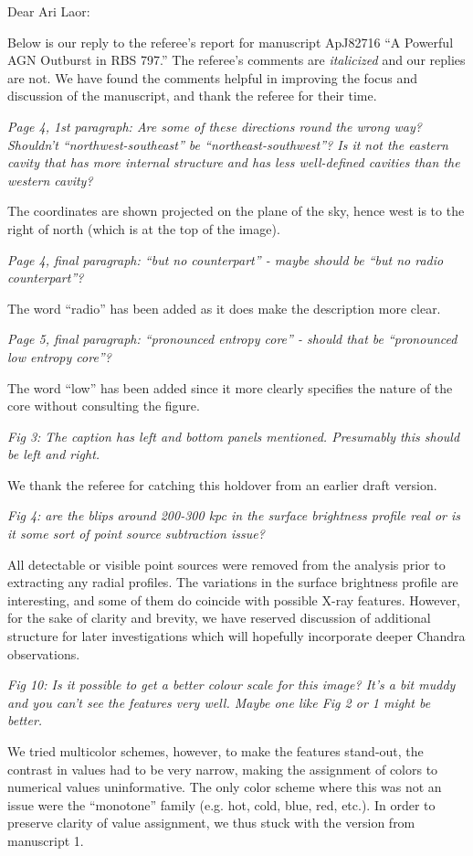 \documentclass[11pt]{article}
\begin{document}
Dear Ari Laor:

Below is our reply to the referee's report for manuscript ApJ82716 ``A
Powerful AGN Outburst in RBS 797.'' The referee's comments are
{\it{italicized}} and our replies are not. We have found the comments
helpful in improving the focus and discussion of the manuscript, and
thank the referee for their time.

\hrulefill

{\it{Page 4, 1st paragraph: Are some of these directions round the
    wrong way? Shouldn't ``northwest-southeast'' be
    ``northeast-southwest''? Is it not the eastern cavity that has
    more internal structure and has less well-defined cavities than
    the western cavity?}}

The coordinates are shown projected on the plane of the sky, hence
west is to the right of north (which is at the top of the image).

\hrulefill

{\it{Page 4, final paragraph: ``but no counterpart'' - maybe should be
    ``but no radio counterpart''?}}

The word ``radio'' has been added as it does make the description more
clear.

\hrulefill

{\it{Page 5, final paragraph: ``pronounced entropy core'' - should
    that be ``pronounced low entropy core''?}}

The word ``low'' has been added since it more clearly specifies the
nature of the core without consulting the figure.

\hrulefill

{\it{Fig 3: The caption has left and bottom panels
    mentioned. Presumably this should be left and right.}}

We thank the referee for catching this holdover from an earlier draft
version.

\hrulefill

{\it{Fig 4: are the blips around 200-300 kpc in the surface brightness
    profile real or is it some sort of point source subtraction
    issue?}}

All detectable or visible point sources were removed from the analysis
prior to extracting any radial profiles. The variations in the surface
brightness profile are interesting, and some of them do coincide with
possible X-ray features. However, for the sake of clarity and brevity,
we have reserved discussion of additional structure for later
investigations which will hopefully incorporate deeper Chandra
observations.

\hrulefill

{\it{Fig 10: Is it possible to get a better colour scale for this
    image? It's a bit muddy and you can't see the features very
    well. Maybe one like Fig 2 or 1 might be better.}}

We tried multicolor schemes, however, to make the features stand-out,
the contrast in values had to be very narrow, making the assignment of
colors to numerical values uninformative. The only color scheme where
this was not an issue were the ``monotone'' family (e.g. hot, cold,
blue, red, etc.). In order to preserve clarity of value assignment, we
thus stuck with the version from manuscript 1.
\end{document}
